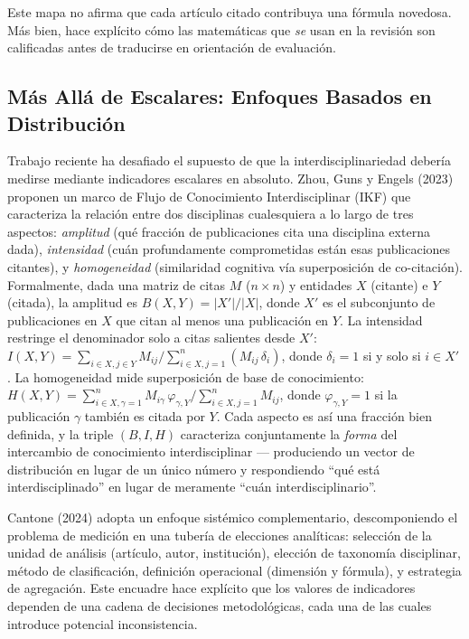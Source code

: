 \documentclass[
]{article}
\begin{document}
Este mapa no afirma que cada artículo citado contribuya una fórmula
novedosa. Más bien, hace explícito cómo las matemáticas que \emph{se}
usan en la revisión son calificadas antes de traducirse en orientación
de evaluación.

\hypertarget{muxe1s-alluxe1-de-escalares-enfoques-basados-en-distribuciuxf3n}{%
\subsection{Más Allá de Escalares: Enfoques Basados en
Distribución}\label{muxe1s-alluxe1-de-escalares-enfoques-basados-en-distribuciuxf3n}}

Trabajo reciente ha desafiado el supuesto de que la
interdisciplinariedad debería medirse mediante indicadores escalares en
absoluto. Zhou, Guns y Engels (2023) proponen un marco de Flujo de
Conocimiento Interdisciplinar (IKF) que caracteriza la relación entre
dos disciplinas cualesquiera a lo largo de tres aspectos:
\emph{amplitud} (qué fracción de publicaciones cita una disciplina
externa dada), \emph{intensidad} (cuán profundamente comprometidas están
esas publicaciones citantes), y \emph{homogeneidad} (similaridad
cognitiva vía superposición de co-citación). Formalmente, dada una
matriz de citas \(M\) (\(n \times n\)) y entidades \(X\) (citante) e
\(Y\) (citada), la amplitud es \(B(X,Y) = |X'|/|X|\), donde \(X'\) es el
subconjunto de publicaciones en \(X\) que citan al menos una publicación
en \(Y\). La intensidad restringe el denominador solo a citas salientes
desde \(X'\):
\(I(X,Y) = \sum_{i \in X, j \in Y} M_{ij} / \sum_{i \in X, j=1}^{n} (M_{ij}\,\delta_i)\),
donde \(\delta_i = 1\) si y solo si \(i \in X'\). La homogeneidad mide
superposición de base de conocimiento:
\(H(X,Y) = \sum_{i \in X, \gamma=1}^{n} M_{i\gamma}\,\varphi_{\gamma,Y} / \sum_{i \in X, j=1}^{n} M_{ij}\),
donde \(\varphi_{\gamma,Y} = 1\) si la publicación \(\gamma\) también es
citada por \(Y\). Cada aspecto es así una fracción bien definida, y la
triple \((B, I, H)\) caracteriza conjuntamente la \emph{forma} del
intercambio de conocimiento interdisciplinar --- produciendo un vector
de distribución en lugar de un único número y respondiendo ``qué está
interdisciplinado'' en lugar de meramente ``cuán interdisciplinario''.

Cantone (2024) adopta un enfoque sistémico complementario,
descomponiendo el problema de medición en una tubería de elecciones
analíticas: selección de la unidad de análisis (artículo, autor,
institución), elección de taxonomía disciplinar, método de
clasificación, definición operacional (dimensión y fórmula), y
estrategia de agregación. Este encuadre hace explícito que los valores
de indicadores dependen de una cadena de decisiones metodológicas, cada
una de las cuales introduce potencial inconsistencia.
\end{document}
